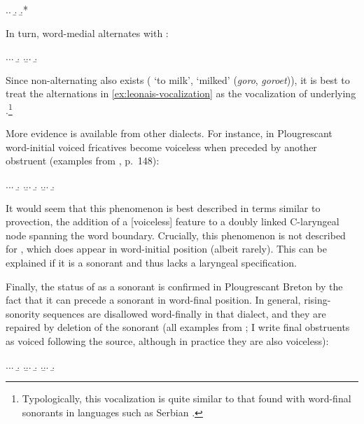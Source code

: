 \ex.\a.
\b.
\b.*\mbi{[ˈkoːvu]}

In turn, word\hyp medial \ipa{[v]} alternates with \ipa{[o]}:

\ex.\label{ex:leonais-vocalization}\a.\a.
\b.
\z.\b.\a.
\b.

Since non\hyp alternating \ipa{[o]} also exists (\ipa{[ˈɡoːro]} `to milk', \ipa{[ɡoˈroːet]} `milked' (\emph{goro}, \emph{goroet})), it is best to treat the alternations in \cref{ex:leonais-vocalization} as the vocalization of underlying \ipa{[v]}.\footnote{Typologically, this vocalization is quite similar to that found with word-final sonorants in languages such as Serbian \citep[\egm][]{moren-serbian}.}

More evidence is available from other dialects. For instance, in Plougrescant word-initial voiced fricatives become voiceless when preceded by another obstruent (examples from \citeauthor{le78:_le_ploug} \cite*{le78:_le_ploug}, p.~148):

\ex.\a.\a.
\b.
\z.\b.\a.
\b.
\z.\b.\a.
\b.

It would seem that this phenomenon is best described in terms similar to provection, \ie the addition of a [voiceless] feature to a doubly linked C\hyp laryngeal node spanning the word boundary. Crucially, this phenomenon is not described for \ipa{[v]}, which does appear in word\hyp initial position (albeit rarely). This can be explained if it is a sonorant and thus lacks a laryngeal specification.

Finally, the status of \ipa{[v]} as a sonorant is confirmed in Plougrescant Breton by the fact that it can precede a sonorant in word\hyp final position. In general, rising\hyp sonority sequences are disallowed word\hyp finally in that dialect, and they are repaired by deletion of the sonorant (all examples from \citeauthor{le78:_le_ploug} \cite*{le78:_le_ploug}; I write final obstruents as voiced following the source, although in practice they are also voiceless):

\ex.\label{ex:plougrescant-rising-sonority}\a.\a.
\b.
\z.\b.\a.
\b.
\z.\b.\a.
\b.


